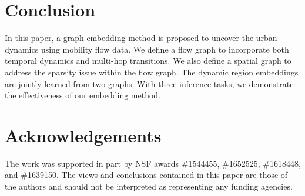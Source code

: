 \section{Conclusion}
\label{sec:conclusion}

In this paper, a graph embedding method is proposed to uncover the urban dynamics using mobility flow data. We define a flow graph to incorporate both temporal dynamics and multi-hop transitions. We also define a spatial graph to address the sparsity issue within the flow graph.  The dynamic region embeddings are jointly learned from two graphs. With three inference tasks, we demonstrate the effectiveness of our embedding method.


\section*{Acknowledgements}
The work was supported in part by NSF awards \#1544455, \#1652525, \#1618448,  and \#1639150. The views and conclusions contained in this paper are those of the authors and should not be interpreted as representing any funding agencies.